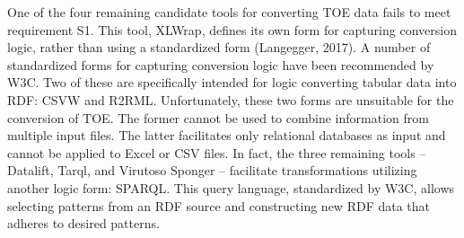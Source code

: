 One of the four remaining candidate tools for converting TOE data fails to meet requirement S1. This tool, XLWrap, defines its own form for capturing conversion logic, rather than using a standardized form (Langegger, 2017). A number of standardized forms for capturing conversion logic have been recommended by W3C. Two of these are specifically intended for logic converting tabular data into RDF: CSVW and R2RML. Unfortunately, these two forms are unsuitable for the conversion of TOE. The former cannot be used to combine information from multiple input files. The latter facilitates only relational databases as input and cannot be applied to Excel or CSV files. In fact, the three remaining tools – Datalift, Tarql, and Virutoso Sponger – facilitate transformations utilizing another logic form: SPARQL. This query language, standardized by W3C, allows selecting patterns from an RDF source and constructing new RDF data that adheres to desired patterns.

